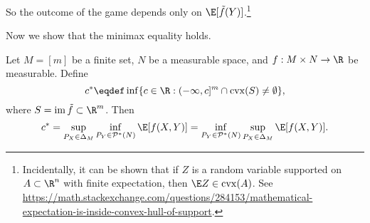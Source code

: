 \documentclass{article}
\newcommand*{\Probstar}[1]{\mathcal{P}^*({#1})}
\newcommand*{\Probfin}[1]{\Delta_{#1}}
\DeclareMathOperator{\cvx}{cvx}
\DeclareMathOperator{\im}{im}
\begin{document}
So the outcome of the game depends only on $\E[\tilde f(Y)]$.\footnote{%
Incidentally, it can be shown that if $Z$ is a random variable supported on $A \subset \R^n$ with finite expectation, then $\E Z \in \cvx(A)$.
See \url{https://math.stackexchange.com/questions/284153/mathematical-expectation-is-inside-convex-hull-of-support}.}

Now we show that the minimax equality holds.

\begin{theorem}\label{thm:semi-finite}
  Let $M = [m]$ be a finite set, $N$ be a measurable space,
  and $f : M \times N \to \R$ be measurable.
  Define
  \[
  c^* \eqdef \inf\{c \in \R : (-\infty, c]^m \cap \cvx(S) \ne \emptyset\},\]
  where $S = \im \tilde f \subset \R^m$.
  Then
  \[c^* = \sup_{P_X \in \Probfin{M}} \inf_{P_Y \in \Probstar{N}} \E[f(X, Y)] = \inf_{P_Y \in \Probstar{N}} \sup_{P_X \in \Probfin{M}} \E[f(X, Y)].\]
\end{theorem}
\end{document}
